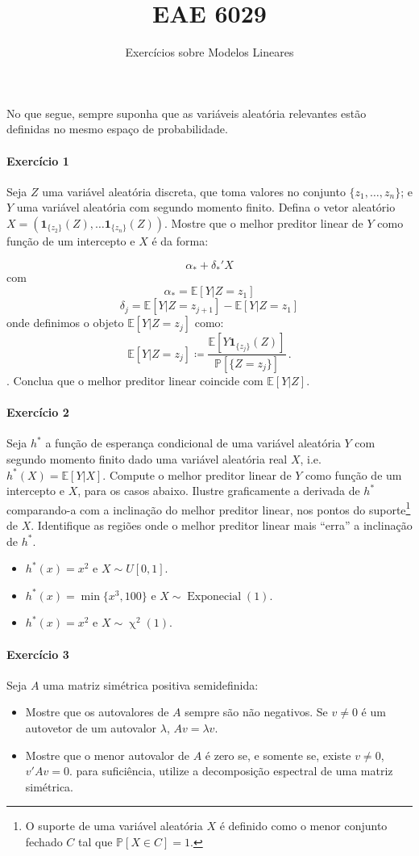 \documentclass[10pt,a4paper]{article}
\title{EAE 6029}
\author{ Exercícios sobre Modelos Lineares}
\date{}
\begin{document}
	\maketitle
	No que segue, sempre suponha que as variáveis aleatória relevantes estão definidas no mesmo espaço de probabilidade.
 \paragraph{Exercício 1} Seja $Z$ uma variável aleatória discreta, que toma valores no conjunto $\{z_1,\ldots, z_n\}$; e $Y$ uma variável aleatória com segundo momento finito. Defina o vetor aleatório $X  = (\mathbf{1}_{\{z_2\}}(Z),\ldots \mathbf{1}_{\{z_n\}}(Z))$. Mostre que o melhor preditor linear de $Y$ como função de um intercepto e $X$ é da forma:
 
 $$\alpha_* + \delta_*'X$$
 com
 $$ \alpha_* =  \mathbb{E}[Y|Z=z_1]$$
$$\delta_j =   \mathbb{E}[Y|Z=z_{j+1}]-\mathbb{E}[Y|Z=z_1]$$
onde definimos o objeto $\mathbb{E}[Y|Z=z_j]$ como:
$$\mathbb{E}[Y|Z=z_j] \coloneqq \frac{\mathbb{E}[Y\mathbf{1}_{\{z_j\}}(Z)]}{\mathbb{P}[\{Z = z_j\}]}\, .$$. Conclua que o melhor preditor linear coincide com $\mathbb{E}[Y|Z]$.

\paragraph{Exercício 2} Seja $h^*$ a função de esperança condicional de uma variável aleatória $Y$ com segundo momento finito dado uma variável aleatória real $X$, i.e. $h^*(X) = \mathbb{E}[Y|X]$. Compute o melhor preditor linear de $Y$ como função de um intercepto e $X$, para os casos abaixo. Ilustre graficamente a derivada de $h^*$ comparando-a com a inclinação do melhor preditor linear, nos pontos do suporte\footnote{O suporte de uma variável aleatória $X$ é definido como o menor conjunto fechado $C$ tal que $\mathbb{P}[X \in C]=1$.} de $X$. Identifique as regiões onde o melhor preditor linear mais ``erra'' a inclinação de $h^*$.

\begin{itemize}
	\item[a] $h^*(x) = x^2 $ e $X\sim U[0,1]$.
	\item[b] $h^*(x) = \min\{x^3,100\}$ e $X \sim \operatorname{Exponecial}(1)$.
	\item[c] $h^*(x) = x^2$ e $X \sim \operatorname{\chi}^2(1)$.
\end{itemize}

 \paragraph{Exercício 3} Seja $A$ uma matriz simétrica positiva semidefinida:
 \begin{itemize}
 	\item[a] Mostre que os autovalores de $A$ sempre são não negativos.  Se $v\neq 0$ é um autovetor de um autovalor $\lambda$, $Av=\lambda v$.
 	\item[b] Mostre que o menor autovalor de $A$ é zero se, e somente se, existe $v \neq 0$, $v'Av = 0$.  para suficiência, utilize a decomposição espectral de uma matriz simétrica.
 \end{itemize} 
 
\end{document}
